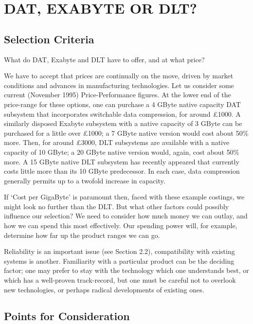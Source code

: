 \documentclass[11pt]{article}
\begin{document}
\section {DAT, EXABYTE OR DLT?}

\subsection {Selection Criteria}

What do DAT, Exabyte and DLT have to offer, and at what price?

We have to accept that prices are continually on the move, driven by market
conditions and advances in manufacturing technologies. Let us consider some
current (November 1995) Price-Performance figures. At the lower end of the
price-range for these options, one can purchase a 4 GByte native capacity
DAT subsystem that incorporates switchable data compression, for around
\pounds 1000. A similarly disposed Exabyte subsystem with a native capacity
of 3 GByte can be purchased for a little over \pounds 1000; a 7 GByte native
version would cost about 50\% more. Then, for around \pounds 3000, DLT
subsystems are available with a native capacity of 10 GByte; a 20 GByte
native version would, again, cost about 50\% more. A 15 GByte native DLT
subsystem has recently appeared that currently costs little more than
its 10 GByte predecessor. In each case, data compression generally permits
up to a twofold increase in capacity.

If `Cost per GigaByte' is paramount then, faced with these example costings,
we might look no further than the DLT. But what other factors could possibly
influence our selection? We need to consider how much money we can outlay,
and how we can spend this most effectively. Our spending power will, for
example, determine how far up the product ranges we can go.

Reliability is an important issue (see Section 2.2), compatibility with
existing systems is another. Familiarity with a particular product can be
the deciding factor; one may prefer to stay with the technology which one
understands best, or which has a well-proven track-record, but one must be
careful not to overlook new technologies, or perhaps radical developments
of existing ones.

\subsection {Points for Consideration}
\end{document}
